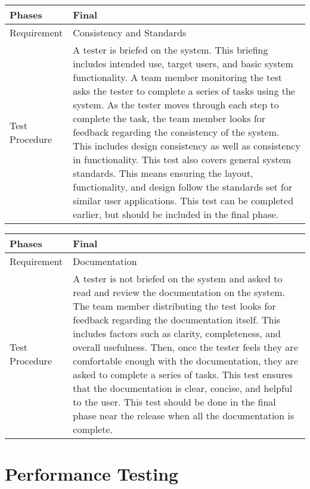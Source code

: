 \documentclass{article}
\begin{document}
\begin{tabular}{| l | p{12cm}  |}
    \hline
	Phases & Final \\ \hline
	Requirement & Consistency and Standards \\ \hline
	Test Procedure & A tester is briefed on the system. This briefing includes
	intended use, target users, and basic system functionality. A team member
	monitoring the test asks the tester to complete a series of tasks using
	the system. As the tester moves through each step to complete the task,
	the team member looks for feedback regarding the consistency of the
	system. This includes design consistency as well as consistency in
	functionality. This test also covers general system standards. This means
	ensuring the layout, functionality, and design follow the standards set
	for similar user applications. This test can be completed earlier, but
	should be included in the final phase.  \\ \hline
\end{tabular}

\begin{tabular}{| l | p{12cm}  |}
    \hline
	Phases & Final \\ \hline
	Requirement & Documentation \\ \hline
	Test Procedure & A tester is not briefed on the system and asked to read
	and review the documentation on the system. The team member distributing
	the test looks for feedback regarding the documentation itself. This
	includes factors such as clarity, completeness, and overall usefulness.
	Then, once the tester feels they are comfortable enough with the
	documentation, they are asked to complete a series of tasks. This test
	ensures that the documentation is clear, concise, and helpful to the user.
	This test should be done in the final phase near the release when all the
	documentation is complete. \\ \hline

\end{tabular}


\newpage

\section{Performance Testing}
\end{document}
